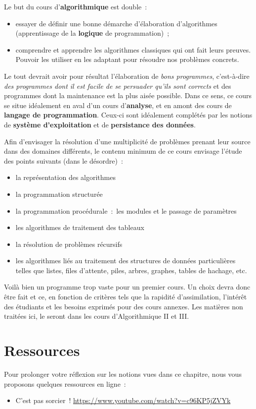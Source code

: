 		Le but du cours d’\textbf{algorithmique} est double~:
	
		\begin{itemize}
		\item
			essayer de définir une bonne démarche d’élaboration d’algorithmes
			(apprentissage de la \textbf{logique} de programmation)~;
		\item
			comprendre et apprendre les algorithmes classiques 
			qui ont fait leurs preuves.
			Pouvoir les utiliser en les adaptant 
			pour résoudre nos problèmes concrets.
		\end{itemize}
	
		Le tout devrait avoir pour résultat l’élaboration 
		de \textit{bons programmes}, 
		c’est-à-dire \textit{des programmes dont il est facile de
		se persuader qu’ils sont corrects} et des programmes dont la
		maintenance est la plus aisée possible. 
		Dans ce sens, ce cours se situe idéalement 
		en aval d’un cours d’\textbf{analyse}, 
		et en amont des cours de \textbf{langage de programmation}. 
		Ceux-ci sont idéalement complétés
		par les notions de \textbf{système d’exploitation} et de
		\textbf{persistance des données}.
	
		Afin d’envisager la résolution d’une multiplicité 
		de problèmes prenant leur source dans des domaines différents, 
		le contenu minimum de ce cours envisage l’étude des points suivants 
		(dans le désordre)~:
	
		\begin{itemize}
		\item 
			la représentation des algorithmes
		\item
			la programmation structurée
		\item
			la programmation procédurale~:~les modules et 
			le passage de paramètres
		\item
			les algorithmes de traitement des tableaux
		\item
			la résolution de problèmes récursifs
		\item
			les algorithmes liés au traitement des structures de données particulières telles
			que listes, files d’attente, piles, arbres, graphes, tables de hachage,
			etc.
		\end{itemize}
	
		Voilà bien un programme trop vaste pour un premier cours.  
		Un choix devra donc être fait et ce, en fonction
		de critères tels que la rapidité d’assimilation, l’intérêt des
		étudiants et les besoins exprimés pour des cours annexes. 
		Les matières non traitées ici, 
		le seront dans les cours d’Algorithmique II et III. 

	\section{Ressources}
	
		Pour prolonger votre réflexion 
		sur les notions vues dans ce chapitre, 
		nous vous proposons quelques ressources en ligne~:
		\begin{itemize}
		\item
			C'est pas sorcier~! 
			\url{https://www.youtube.com/watch?v=c96KP5jZVYk}
		\end{itemize}
